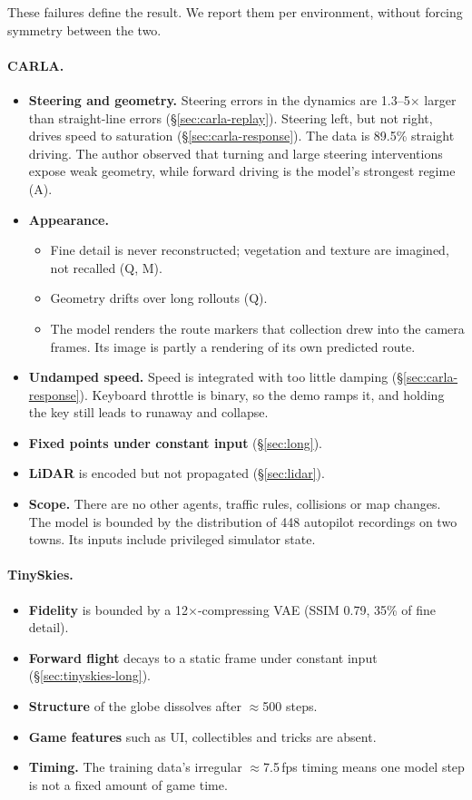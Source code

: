 \documentclass[11pt]{article}
\begin{document}
These failures define the result. We report them per environment, without forcing symmetry between the two.

\paragraph{CARLA.}
\begin{itemize}
  \item \textbf{Steering and geometry.} Steering errors in the dynamics are 1.3--5$\times$ larger than straight-line errors (\S\ref{sec:carla-replay}). Steering left, but not right, drives speed to saturation (\S\ref{sec:carla-response}). The data is 89.5\% straight driving. The author observed that turning and large steering interventions expose weak geometry, while forward driving is the model's strongest regime (A).
  \item \textbf{Appearance.}
  \begin{itemize}
    \item Fine detail is never reconstructed; vegetation and texture are imagined, not recalled (Q, M).
    \item Geometry drifts over long rollouts (Q).
    \item The model renders the route markers that collection drew into the camera frames. Its image is partly a rendering of its own predicted route.
  \end{itemize}
  \item \textbf{Undamped speed.} Speed is integrated with too little damping (\S\ref{sec:carla-response}). Keyboard throttle is binary, so the demo ramps it, and holding the key still leads to runaway and collapse.
  \item \textbf{Fixed points under constant input} (\S\ref{sec:long}).
  \item \textbf{LiDAR} is encoded but not propagated (\S\ref{sec:lidar}).
  \item \textbf{Scope.} There are no other agents, traffic rules, collisions or map changes. The model is bounded by the distribution of 448 autopilot recordings on two towns. Its inputs include privileged simulator state.
\end{itemize}

\paragraph{TinySkies.}
\begin{itemize}
  \item \textbf{Fidelity} is bounded by a 12$\times$-compressing VAE (SSIM 0.79, 35\% of fine detail).
  \item \textbf{Forward flight} decays to a static frame under constant input (\S\ref{sec:tinyskies-long}).
  \item \textbf{Structure} of the globe dissolves after $\approx$500 steps.
  \item \textbf{Game features} such as UI, collectibles and tricks are absent.
  \item \textbf{Timing.} The training data's irregular $\approx$7.5\,fps timing means one model step is not a fixed amount of game time.
\end{itemize}
\end{document}
